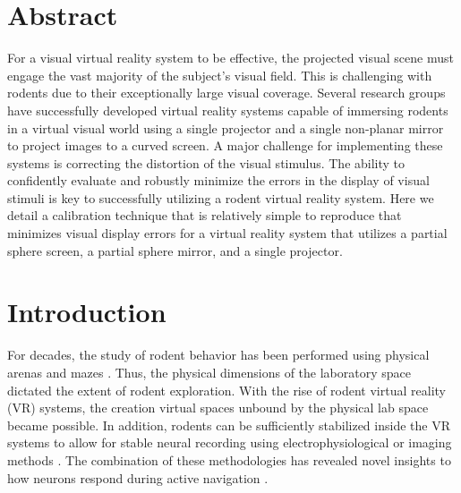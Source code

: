 \documentclass[10pt,letterpaper]{article}
\begin{document}
\section*{Abstract}
For a visual virtual reality system to be effective, the projected visual scene
must engage the vast majority of the subject's visual field.  This is
challenging with rodents due to their exceptionally large visual coverage.
Several research groups have successfully developed virtual reality systems
capable of immersing rodents in a virtual visual world using a single projector
and a single non-planar mirror to project images to a curved screen. A major
challenge for implementing these systems is correcting the distortion of the
visual stimulus.  The ability to confidently evaluate and robustly minimize the
errors in the display of visual stimuli is key to successfully utilizing a
rodent virtual reality system. Here we detail a calibration technique that is
relatively simple to reproduce that minimizes visual display errors for a
virtual reality system that utilizes a partial sphere screen, a partial sphere
mirror, and a single projector.



\linenumbers

\section*{Introduction}
For decades, the study of rodent behavior has been performed using physical
arenas and mazes \cite{Moser2008RodentSpaceRev}.  Thus, the physical dimensions
of the laboratory space dictated the extent of rodent exploration. With the
rise of rodent virtual reality (VR) systems, the creation virtual spaces
unbound by the physical lab space became possible. In addition, rodents can be
sufficiently stabilized inside the VR systems to allow for stable neural
recording using electrophysiological or imaging methods
\cite{harvey2009intracellular, schmidt2013cellular, aronov2014engagement,
keller2012sensorimotor, ayaz2013locomotion, saleem2013integration}.  The
combination of these methodologies has revealed novel insights to how neurons
respond during active navigation \cite{harvey2009intracellular,
schmidt2013cellular, aronov2014engagement, keller2012sensorimotor,
ayaz2013locomotion, saleem2013integration}.
\end{document}
